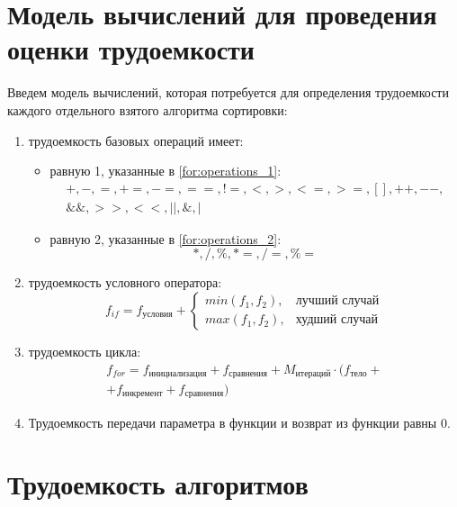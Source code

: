 \section{Модель вычислений для проведения оценки трудоемкости}

Введем модель вычислений, которая потребуется для определения трудоемкости каждого отдельного взятого алгоритма сортировки:
\begin{enumerate}
	\item трудоемкость базовых операций имеет:
	\begin{itemize}
		\item равную 1, указанные в \ref{for:operations_1}:
		\begin{equation}
			\label{for:operations_1}
			\begin{aligned}
				+, -, =, +=, -=, ==, !=, <, >, <=, >=, [], ++, {-}-,\\
				\&\&, >>, <<, ||, \&, |
			\end{aligned}
		\end{equation}
		\item равную 2, указанные в \ref{for:operations_2}:
		\begin{equation}
			\label{for:operations_2}
			*, /, \%, *=, /=, \%=
		\end{equation}
	\end{itemize}
	\item трудоемкость условного оператора:
	\begin{equation}
		\label{for:if}
		f_{if} = f_{\text{условия}} + 
		\begin{cases}
			min(f_1, f_2), & \text{лучший случай}\\
			max(f_1, f_2), & \text{худший случай}
		\end{cases}
	\end{equation}
	\item трудоемкость цикла:
	\begin{equation}
		\label{for:for}
		\begin{aligned}
			f_{for} = f_{\text{инициализация}} + f_{\text{сравнения}} + M_{\text{итераций}} \cdot (f_{\text{тело}} +\\
			+ f_{\text{инкремент}} + f_{\text{сравнения}})
		\end{aligned}
	\end{equation}
	\item Трудоемкость передачи параметра в функции и возврат из функции равны 0.
\end{enumerate}

\section{Трудоемкость алгоритмов}


